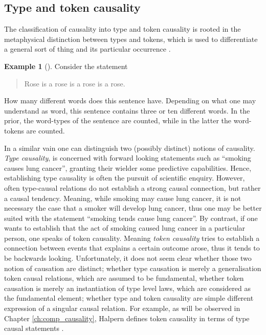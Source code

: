 \documentclass[11pt,a4paper]{book}
\theoremstyle{definition}
\theoremstyle{definition}
\newtheorem{example}{Example}[section]
\theoremstyle{definition}
\theoremstyle{remark}
\begin{document}
\subsection{Type and token causality} 
The classification of causality into type and token causality is rooted in the metaphysical distinction between types and tokens, which is used to differentiate a general sort of thing and its particular occurrence \cite{wetzel2018typetoken}.

\begin{example}[\cite{hausman2005causal}]
Consider the statement 
\begin{quote}
Rose is a rose is a rose is a rose.
\end{quote}
How many different words does this sentence have.  Depending on what one may understand as word, this sentence contains three or ten different words. In the prior, the word-types of the sentence are counted, while in the latter the word-tokens are counted. 
\end{example}

In a similar vain one can distinguish two (possibly distinct) notions of  causality. \emph{Type causality}, is concerned with forward looking statements such as ``smoking causes lung cancer'', granting their wielder some predictive capabilities. Hence, establishing type causality is often the pursuit of scientific enquiry. However, often type-causal relations do not establish a strong causal connection, but rather a causal tendency. Meaning, while smoking may cause lung cancer, it is not necessary the case that a smoker will develop lung cancer, thus one may be better suited with the statement ``smoking tends cause lung cancer''. By contrast, if one wants to establish that the act of smoking caused lung cancer in a particular person, one speaks of token causality. Meaning \emph{token causality} tries to establish a connection between events that explains a certain outcome arose, thus it tends to be backwards looking.
Unfortunately, it does not seem clear whether those two notion of causation are distinct; whether type causation is merely a generalisation token causal relations, which are assumed to be fundamental, whether token causation is merely an instantiation of type level laws, which are considered as the fundamental element; whether type and token causality are simple different expression of a singular causal relation. 
For example, as will be observed in Chapter \ref{ch:comp_causality},  Halpern defines token causality in terms of type causal statements \cite{hausman2005causal,halpern2016actual}. 
\end{document}
